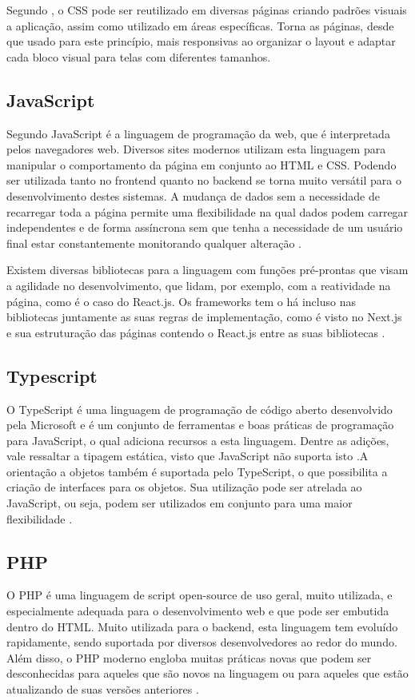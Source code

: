 Segundo , o CSS pode ser reutilizado em diversas páginas criando padrões visuais a aplicação, assim como utilizado em áreas específicas. Torna as páginas, desde que usado para este princípio, mais responsivas ao organizar o layout e adaptar cada bloco visual para telas com diferentes tamanhos.

\subsection{JavaScript}
Segundo  JavaScript é a linguagem de programação da web, que é interpretada pelos navegadores web. Diversos sites modernos utilizam esta linguagem para manipular o comportamento da página em conjunto ao HTML e CSS. Podendo ser utilizada tanto no frontend quanto no backend se torna muito versátil para o desenvolvimento destes sistemas. A mudança de dados sem a necessidade de recarregar toda a página permite uma flexibilidade na qual dados podem carregar independentes e de forma assíncrona sem que tenha a necessidade de um usuário final estar constantemente monitorando qualquer alteração \cite{FLANAGAN}.

Existem diversas bibliotecas para a linguagem com funções pré-prontas que visam a agilidade no desenvolvimento, que lidam, por exemplo, com a reatividade na página, como é o caso do React.js. Os frameworks tem o há incluso nas bibliotecas juntamente as suas regras de implementação, como é visto no Next.js e sua estruturação das páginas contendo o React.js entre as suas bibliotecas \cite{ROBBINS}.

\subsection{Typescript}
O TypeScript é uma linguagem de programação de código aberto desenvolvido pela Microsoft e é um conjunto de ferramentas e boas práticas de programação para JavaScript, o qual adiciona recursos a esta linguagem. Dentre as adições, vale ressaltar a tipagem estática, visto que JavaScript não suporta isto \cite{TYPESCRIPT}.A orientação a objetos também é suportada pelo TypeScript, o que possibilita a criação de interfaces para os objetos. Sua utilização pode ser atrelada ao JavaScript, ou seja, podem ser utilizados em conjunto para uma maior flexibilidade \cite{CHERNY}.

\subsection{PHP}
O PHP é uma linguagem de script open-source de uso geral, muito utilizada, e especialmente adequada para o desenvolvimento web e que pode ser embutida dentro do HTML. Muito utilizada para o backend, esta linguagem tem evoluído rapidamente, sendo suportada por diversos desenvolvedores ao redor do mundo. Além disso, o PHP moderno engloba muitas práticas novas que podem ser desconhecidas para aqueles que são novos na linguagem ou para aqueles que estão atualizando de suas versões anteriores \cite{LOCKHART}.

